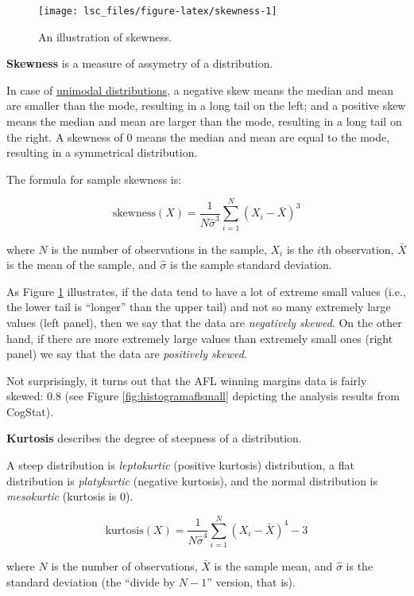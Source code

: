\documentclass[
  11pt,
  a4paper,
  twoside,symmetric,openright]{book}
\theoremstyle{break}
\theoremstyle{break}
\begin{document}
\begin{figure}[H]

{\centering \texttt{[image: lsc\_files/figure-latex/skewness-1]} 

}

\caption{An illustration of skewness.}\label{fig:skewness}
\end{figure}

\begin{definition}[Skewness]
\protect\hypertarget{def:defskewness}{}\label{def:defskewness}\textbf{Skewness} is a measure of assymetry of a distribution.

In case of \hyperref[calloutmultimodal]{unimodal distributions}, a negative skew means the median and mean are smaller than the mode, resulting in a long tail on the left; and a positive skew means the median and mean are larger than the mode, resulting in a long tail on the right. A skewness of 0 means the median and mean are equal to the mode, resulting in a symmetrical distribution.

The formula for sample skewness is:

\[
\mbox{skewness}(X) = \frac{1}{N \hat\sigma^3} \sum_{i=1}^N \left( X_i - \bar{X} \right)^3
\]

where \(N\) is the number of observations in the sample, \(X_i\) is the \(i\)th observation, \(\bar{X}\) is the mean of the sample, and \(\hat\sigma\) is the sample standard deviation.
\end{definition}

As Figure \ref{fig:skewness} illustrates, if the data tend to have a lot of extreme small values (i.e., the lower tail is ``longer'' than the upper tail) and not so many extremely large values (left panel), then we say that the data are \emph{negatively skewed}. On the other hand, if there are more extremely large values than extremely small ones (right panel) we say that the data are \emph{positively skewed}.

Not surprisingly, it turns out that the AFL winning margins data is fairly skewed: \(0.8\) (see Figure \ref{fig:histogramaflsmall} depicting the analysis results from CogStat).

\begin{definition}[Kurtosis]
\protect\hypertarget{def:defkurtosis}{}\label{def:defkurtosis}\textbf{Kurtosis} describes the degree of steepness of a distribution.

A steep distribution is \emph{leptokurtic} (positive kurtosis) distribution, a flat distribution is \emph{platykurtic} (negative kurtosis), and the normal distribution is \emph{mesokurtic} (kurtosis is 0).

\[
\mbox{kurtosis}(X) = \frac{1}{N \hat\sigma^4} \sum_{i=1}^N \left( X_i - \bar{X} \right)^4 - 3
\]

where \(N\) is the number of observations, \(\bar{X}\) is the sample mean, and \(\hat{\sigma}\) is the standard deviation (the ``divide by \(N-1\)'' version, that is).
\end{definition}
\end{document}
